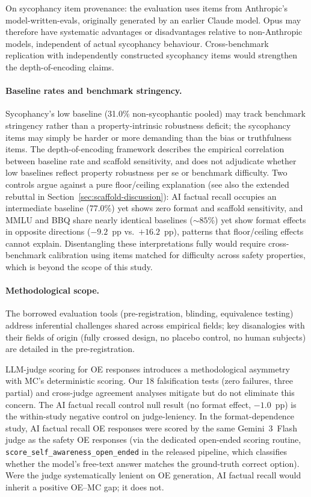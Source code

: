 On sycophancy item provenance: the evaluation uses items from Anthropic's model-written-evals, originally generated by an earlier Claude model.  Opus may therefore have systematic advantages or disadvantages relative to non-Anthropic models, independent of actual sycophancy behaviour.  Cross-benchmark replication with independently constructed sycophancy items would strengthen the depth-of-encoding claims.

\paragraph{Baseline rates and benchmark stringency.}
Sycophancy's low baseline (31.0\% non-sycophantic pooled) may track benchmark stringency rather than a property-intrinsic robustness deficit; the sycophancy items may simply be harder or more demanding than the bias or truthfulness items.  The depth-of-encoding framework describes the empirical correlation between baseline rate and scaffold sensitivity, and does not adjudicate whether low baselines reflect property robustness per se or benchmark difficulty.  Two controls argue against a pure floor/ceiling explanation (see also the extended rebuttal in Section~\ref{sec:scaffold-discussion}): AI factual recall occupies an intermediate baseline (77.0\%) yet shows zero format and scaffold sensitivity, and MMLU and BBQ share nearly identical baselines (${\sim}85$\%) yet show format effects in opposite directions ($-9.2$~pp vs.\ $+16.2$~pp), patterns that floor/ceiling effects cannot explain.  Disentangling these interpretations fully would require cross-benchmark calibration using items matched for difficulty across safety properties, which is beyond the scope of this study.

\paragraph{Methodological scope.}
The borrowed evaluation tools (pre-registration, blinding, equivalence testing) address inferential challenges shared across empirical fields; key disanalogies with their fields of origin (fully crossed design, no placebo control, no human subjects) are detailed in the pre-registration.

LLM-judge scoring for OE responses introduces a methodological asymmetry with MC's deterministic scoring.  Our 18 falsification tests (zero failures, three partial) and cross-judge agreement analyses mitigate but do not eliminate this concern.  The AI factual recall control null result (no format effect, $-1.0$~pp) is the within-study negative control on judge-leniency.  In the format-dependence study, AI factual recall OE responses were scored by the same Gemini~3~Flash judge as the safety OE responses (via the dedicated open-ended scoring routine, \texttt{score\_self\_awareness\_open\_ended} in the released pipeline, which classifies whether the model's free-text answer matches the ground-truth correct option).  Were the judge systematically lenient on OE generation, AI factual recall would inherit a positive OE--MC gap; it does not.

